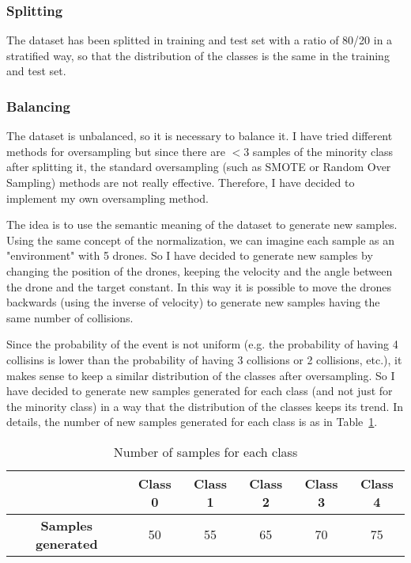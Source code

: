 \subsubsection{Splitting} \label{sec:preprocessing-splitting}
The dataset has been splitted in training and test set with a ratio of 80/20 in a stratified way, so that the distribution of the classes is the same in the training and test set.

\subsubsection{Balancing} \label{sec:preprocessing-balancing}
The dataset is unbalanced, so it is necessary to balance it.
I have tried different methods for oversampling but since there are $<3$ samples of the minority class after splitting it, the standard oversampling (such as SMOTE or Random Over Sampling) methods are not really effective.
Therefore, I have decided to implement my own oversampling method.

The idea is to use the semantic meaning of the dataset to generate new samples.
Using the same concept of the normalization, we can imagine each sample as an "environment" with 5 drones.
So I have decided to generate new samples by changing the position of the drones, keeping the velocity and the angle between the drone and the target constant.
In this way it is possible to move the drones backwards (using the inverse of velocity) to generate new samples having the same number of collisions.

Since the probability of the event is not uniform (e.g. the probability of having 4 collisins is lower than the probability of having 3 collisions or 2 collisions, etc.), it makes sense to keep a similar distribution of the classes after oversampling.
So I have decided to generate new samples generated for each class (and not just for the minority class) in a way that the distribution of the classes keeps its trend.
In details, the number of new samples generated for each class is as in Table~\ref{tab:preprocessing-balancing}.
\begin{table}[h]
    \centering
    \begin{tabular}{|c|c|c|c|c|c|}
        \hline
        & \textbf{Class 0} & \textbf{Class 1} & \textbf{Class 2} & \textbf{Class 3} & \textbf{Class 4} \\ \hline
        \textbf{Samples generated} & 50 & 55 & 65 & 70 & 75 \\ \hline
    \end{tabular}
    \caption{Number of samples for each class}
    \label{tab:preprocessing-balancing}
\end{table}

